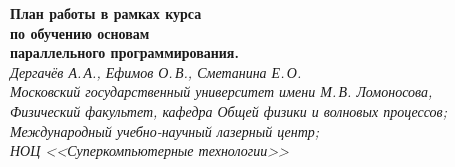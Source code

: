 \documentclass[12pt,a4paper,fleqn]{article}
\begin{document}
	\begin{center}
		{\Huge
			\textbf{План работы в рамках курса\\
				по обучению основам\\
				параллельного программирования.\\
			}
		}
		\vspace{1em}
		{\large
			\textit{Дергачёв А.\,А., Ефимов О.\,В., Сметанина Е.\,О.\quad\textup{\textcopyleft}\\
				Московский государственный университет имени М.\,В. Ломоносова,\\
				Физический факультет, кафедра Общей физики и волновых процессов;\\
				Международный учебно-научный лазерный центр;\\
				НОЦ <<Суперкомпьютерные технологии>>\\
			}
		}
		\vspace{1em}
	\end{center}
	
	
	
	
	
	
	
\end{document}

